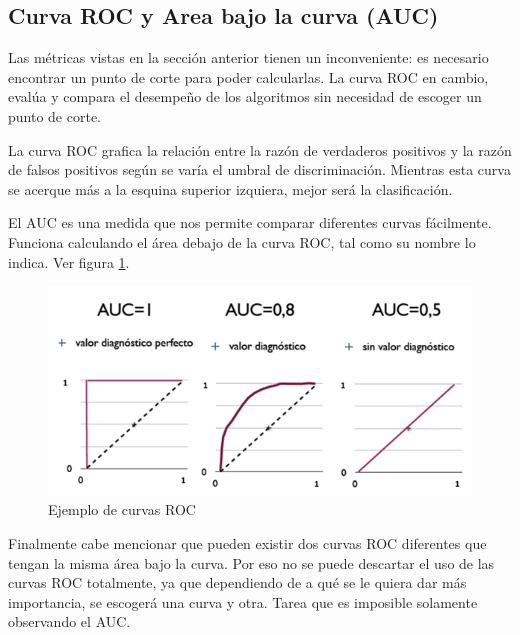 \subsection{Curva ROC y Area bajo la curva (AUC)}

Las métricas vistas en la sección anterior tienen un inconveniente: es necesario encontrar un punto de corte para poder calcularlas. La curva ROC en cambio, evalúa y compara el desempeño de los algoritmos sin necesidad de escoger un punto de corte.

La curva ROC grafica la relación entre la razón de verdaderos positivos y la razón de falsos positivos según se varía el umbral de discriminación. Mientras esta curva se acerque más a la esquina superior izquiera, mejor será la clasificación.

El \ac{AUC} es una medida que nos permite comparar diferentes curvas fácilmente. Funciona calculando el área debajo de la curva ROC, tal como su nombre lo indica. Ver figura \ref{fig:eg-roc}.

\begin{figure}
    \centering
    \caption{Ejemplo de curvas ROC}
    \label{fig:eg-roc}
    \includegraphics[width=0.8\linewidth]{graficos/eg_roc.png}
\end{figure}

Finalmente cabe mencionar que pueden existir dos curvas ROC diferentes que tengan la misma área bajo la curva. Por eso no se puede descartar el uso de las curvas ROC totalmente, ya que dependiendo de a qué se le quiera dar más importancia, se escogerá una curva y otra. Tarea que es imposible solamente observando el \ac{AUC}.





